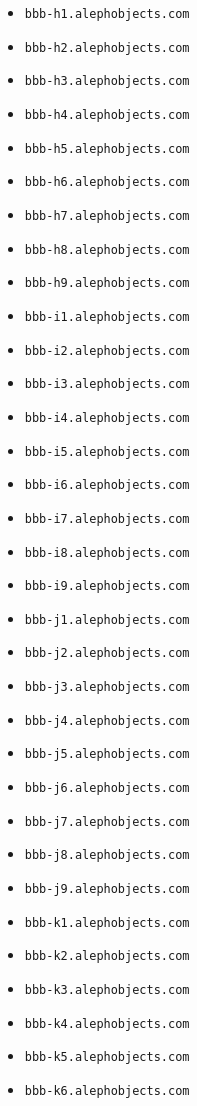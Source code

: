 \begin{itemize}
\item \texttt{bbb-h1.alephobjects.com}
\item \texttt{bbb-h2.alephobjects.com}
\item \texttt{bbb-h3.alephobjects.com}
\item \texttt{bbb-h4.alephobjects.com}
\item \texttt{bbb-h5.alephobjects.com}
\item \texttt{bbb-h6.alephobjects.com}
\item \texttt{bbb-h7.alephobjects.com}
\item \texttt{bbb-h8.alephobjects.com}
\item \texttt{bbb-h9.alephobjects.com}
\item \texttt{bbb-i1.alephobjects.com}
\item \texttt{bbb-i2.alephobjects.com}
\item \texttt{bbb-i3.alephobjects.com}
\item \texttt{bbb-i4.alephobjects.com}
\item \texttt{bbb-i5.alephobjects.com}
\item \texttt{bbb-i6.alephobjects.com}
\item \texttt{bbb-i7.alephobjects.com}
\item \texttt{bbb-i8.alephobjects.com}
\item \texttt{bbb-i9.alephobjects.com}
\item \texttt{bbb-j1.alephobjects.com}
\item \texttt{bbb-j2.alephobjects.com}
\item \texttt{bbb-j3.alephobjects.com}
\item \texttt{bbb-j4.alephobjects.com}
\item \texttt{bbb-j5.alephobjects.com}
\item \texttt{bbb-j6.alephobjects.com}
\item \texttt{bbb-j7.alephobjects.com}
\item \texttt{bbb-j8.alephobjects.com}
\item \texttt{bbb-j9.alephobjects.com}
\item \texttt{bbb-k1.alephobjects.com}
\item \texttt{bbb-k2.alephobjects.com}
\item \texttt{bbb-k3.alephobjects.com}
\item \texttt{bbb-k4.alephobjects.com}
\item \texttt{bbb-k5.alephobjects.com}
\item \texttt{bbb-k6.alephobjects.com}

\end{itemize}
